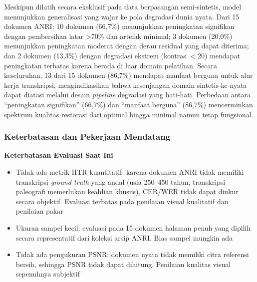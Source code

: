 \documentclass[12pt,a4paper]{article}
\begin{document}
Meskipun dilatih secara eksklusif pada data berpasangan semi-sintetis, model menunjukkan generalisasi yang wajar ke pola degradasi dunia nyata. Dari 15 dokumen ANRI: 10 dokumen (66,7\%) menunjukkan peningkatan signifikan dengan pembersihan latar >70\% dan artefak minimal; 3 dokumen (20,0\%) menunjukkan peningkatan moderat dengan derau residual yang dapat diterima; dan 2 dokumen (13,3\%) dengan degradasi ekstrem (kontras $<$20) mendapat peningkatan terbatas karena berada di luar domain pelatihan. Secara keseluruhan, 13 dari 15 dokumen (86,7\%) mendapat manfaat berguna untuk alur kerja transkripsi, mengindikasikan bahwa kesenjangan domain sintetis-ke-nyata dapat diatasi melalui desain \textit{pipeline} degradasi yang hati-hati. Perbedaan antara ``peningkatan signifikan'' (66,7\%) dan ``manfaat berguna'' (86,7\%) mencerminkan spektrum kualitas restorasi dari optimal hingga minimal namun tetap fungsional.

\vspace{0.8em}

\subsubsection{Keterbatasan dan Pekerjaan Mendatang}
\label{subsubsec:anri-keterbatasan}

\textbf{Keterbatasan Evaluasi Saat Ini}
\begin{itemize}[nosep]
    \item Tidak ada metrik HTR kuantitatif: karena dokumen ANRI tidak memiliki transkripsi \textit{ground truth} yang andal (usia 250--450 tahun, transkripsi paleografi memerlukan keahlian khusus), CER/WER tidak dapat diukur secara objektif. Evaluasi terbatas pada penilaian visual kualitatif dan penilaian pakar
    
    \item Ukuran sampel kecil: evaluasi pada 15 dokumen halaman penuh yang dipilih secara representatif dari koleksi arsip ANRI. Bias sampel mungkin ada
    
    \item Tidak ada pengukuran PSNR: dokumen nyata tidak memiliki citra referensi bersih, sehingga PSNR tidak dapat dihitung. Penilaian kualitas visual sepenuhnya subjektif
\end{itemize}
\end{document}

